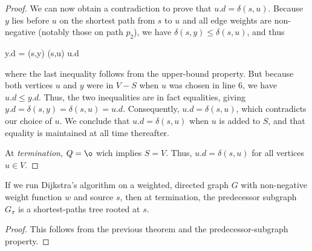\begin{proof}
  We can now obtain a contradiction to prove that $u.d = \delta(s,u)$. Because $y$ lies before $u$ on the shortest path from $s$ to $u$ and all edge weights are non-negative (notably those on path $p_2$), we have $\delta(s,y) \leq \delta(s,u)$, and thus

  \bee
  y.d = \delta(s,y) \leq \delta(s,u) \leq u.d
  \eee

  where the last inequality follows from the upper-bound property. But because both vertices $u$ and $y$ were in $V-S$ when $u$ was chosen in line $6$, we have $u.d \leq y.d$. Thus, the two inequalities are in fact equalities, giving $y.d = \delta(s,y) = \delta(s,u) = u.d$. Consequently, $u.d = \delta(s,u)$, which contradicts our choice of $u$. We conclude that $u.d = \delta(s,u)$ when $u$ is added to $S$, and that equality is maintained at all time thereafter.
  
  At \emph{termination}, $Q = \o$ wich implies $S = V$. Thus, $u.d = \delta(s,u)$ for all vertices $u \in V$.
  
\end{proof}

\begin{theorem} If we run Dijkstra's algorithm on a weighted, directed graph $G$ with non-negative weight function $w$ and source $s$, then at termination, the predecessor subgraph $G_\pi$ is a shortest-paths tree rooted at $s$.
\end{theorem}

\begin{proof}
  This follows from the previous theorem and the predecessor-subgraph property.
\end{proof}

